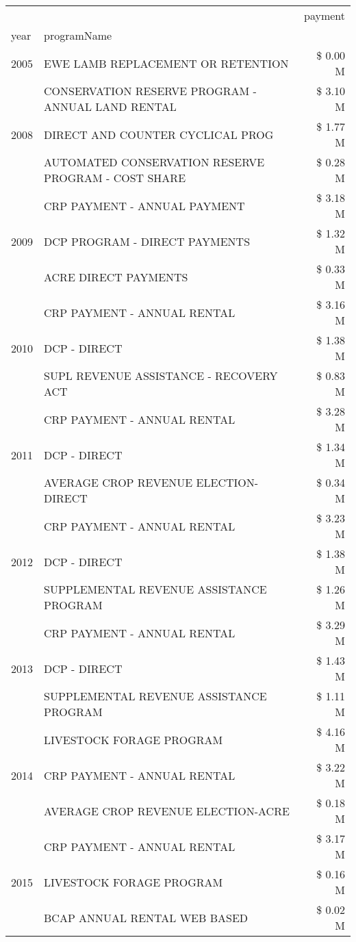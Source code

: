 \begin{tabular}{llr}
\toprule
 &  & payment \\
year & programName &  \\
\midrule
2005 & EWE LAMB REPLACEMENT OR RETENTION & \$ 0.00 M \\
\cline{1-3}
\multirow[t]{3}{*}{2008} & CONSERVATION RESERVE PROGRAM - ANNUAL LAND RENTAL & \$ 3.10 M \\
 & DIRECT AND COUNTER CYCLICAL PROG & \$ 1.77 M \\
 & AUTOMATED CONSERVATION RESERVE PROGRAM - COST SHARE & \$ 0.28 M \\
\cline{1-3}
\multirow[t]{3}{*}{2009} & CRP PAYMENT - ANNUAL PAYMENT & \$ 3.18 M \\
 & DCP PROGRAM - DIRECT PAYMENTS & \$ 1.32 M \\
 & ACRE DIRECT PAYMENTS & \$ 0.33 M \\
\cline{1-3}
\multirow[t]{3}{*}{2010} & CRP PAYMENT - ANNUAL RENTAL & \$ 3.16 M \\
 & DCP - DIRECT & \$ 1.38 M \\
 & SUPL REVENUE ASSISTANCE - RECOVERY ACT & \$ 0.83 M \\
\cline{1-3}
\multirow[t]{3}{*}{2011} & CRP PAYMENT - ANNUAL RENTAL & \$ 3.28 M \\
 & DCP - DIRECT & \$ 1.34 M \\
 & AVERAGE CROP REVENUE ELECTION-DIRECT & \$ 0.34 M \\
\cline{1-3}
\multirow[t]{3}{*}{2012} & CRP PAYMENT - ANNUAL RENTAL & \$ 3.23 M \\
 & DCP - DIRECT & \$ 1.38 M \\
 & SUPPLEMENTAL REVENUE ASSISTANCE PROGRAM & \$ 1.26 M \\
\cline{1-3}
\multirow[t]{3}{*}{2013} & CRP PAYMENT - ANNUAL RENTAL & \$ 3.29 M \\
 & DCP - DIRECT & \$ 1.43 M \\
 & SUPPLEMENTAL REVENUE ASSISTANCE PROGRAM & \$ 1.11 M \\
\cline{1-3}
\multirow[t]{3}{*}{2014} & LIVESTOCK FORAGE PROGRAM & \$ 4.16 M \\
 & CRP PAYMENT - ANNUAL RENTAL & \$ 3.22 M \\
 & AVERAGE CROP REVENUE ELECTION-ACRE & \$ 0.18 M \\
\cline{1-3}
\multirow[t]{3}{*}{2015} & CRP PAYMENT - ANNUAL RENTAL & \$ 3.17 M \\
 & LIVESTOCK FORAGE PROGRAM & \$ 0.16 M \\
 & BCAP ANNUAL RENTAL WEB BASED & \$ 0.02 M \\

\end{tabular}

